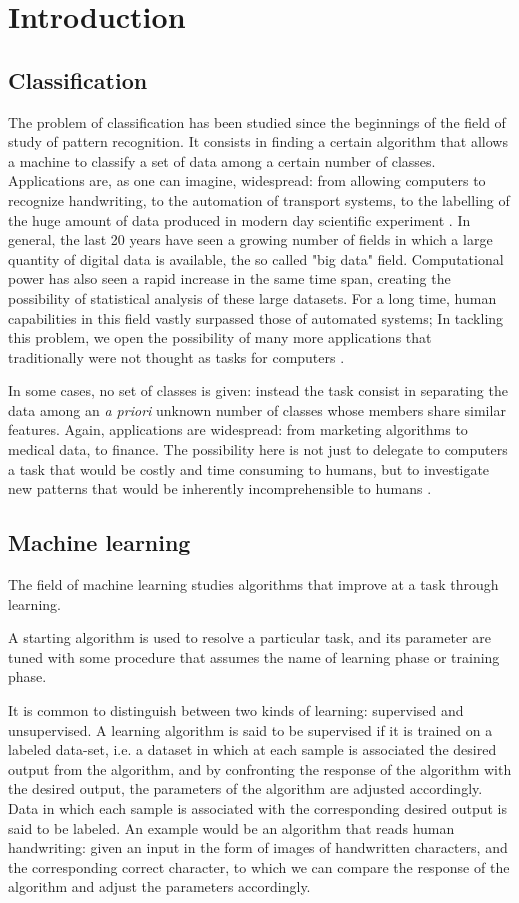 \documentclass[a4paper]{report}
\begin{document}
\chapter{Introduction}

\section{Classification}
The problem of classification has been studied since the beginnings of the field of study of pattern recognition.
It consists in finding a certain algorithm that allows a machine to classify a set of data among a certain number of classes.
Applications are, as one can imagine, widespread:
from allowing computers to recognize handwriting, to the automation of transport systems, to the labelling of the huge amount of data produced in modern day scientific experiment \cite{hand1997statistical}.
In general, the last 20 years have seen a growing number of fields in which a large quantity of digital data is available, the so called "big data" field.
Computational power has also seen a rapid increase in the same time span, creating the possibility of statistical analysis of these large datasets.
For a long time, human capabilities in this field vastly surpassed those of automated systems;
In tackling this problem, we open the possibility of many more applications that traditionally were not thought as  tasks for computers \cite{marx2013big}.

In some cases, no set of classes is given:
instead the task consist in separating the data among an \textit{a priori} unknown number of classes whose members share similar features.
Again, applications are widespread:
from marketing algorithms to medical data, to finance.
The possibility here is not just to delegate to computers a task that would be costly and time consuming to humans, but to investigate new patterns that would be inherently incomprehensible to humans \cite{magoulas1999machine}.

\section{Machine learning}
The field of machine learning studies algorithms that improve at a task through learning.

A starting algorithm is used to resolve a particular task, and its parameter are tuned with some procedure that assumes the name of learning phase or training phase.

It is common to distinguish between two kinds of learning:
supervised and unsupervised.
A learning algorithm is said to be supervised if it is trained on a labeled data-set, i.e.
a dataset in which at each sample is associated the desired output from the algorithm, and by confronting the response of the algorithm with the desired output, the parameters of the algorithm are adjusted accordingly.
Data in which each sample is associated with the corresponding desired output is said to be labeled.
An example would be an algorithm that reads human handwriting:
given an input in the form of images of handwritten characters, and the corresponding correct character, to which we can compare the response of the algorithm and adjust the parameters accordingly.
\end{document}
